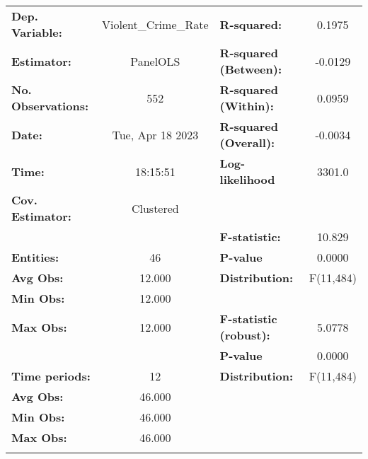 \begin{center}
\begin{tabular}{lclc}
\toprule
\textbf{Dep. Variable:}           & Violent\_Crime\_Rate & \textbf{  R-squared:         }   &      0.1975      \\
\textbf{Estimator:}               &       PanelOLS       & \textbf{  R-squared (Between):}  &     -0.0129      \\
\textbf{No. Observations:}        &         552          & \textbf{  R-squared (Within):}   &      0.0959      \\
\textbf{Date:}                    &   Tue, Apr 18 2023   & \textbf{  R-squared (Overall):}  &     -0.0034      \\
\textbf{Time:}                    &       18:15:51       & \textbf{  Log-likelihood     }   &      3301.0      \\
\textbf{Cov. Estimator:}          &      Clustered       & \textbf{                     }   &                  \\
\textbf{}                         &                      & \textbf{  F-statistic:       }   &      10.829      \\
\textbf{Entities:}                &          46          & \textbf{  P-value            }   &      0.0000      \\
\textbf{Avg Obs:}                 &        12.000        & \textbf{  Distribution:      }   &    F(11,484)     \\
\textbf{Min Obs:}                 &        12.000        & \textbf{                     }   &                  \\
\textbf{Max Obs:}                 &        12.000        & \textbf{  F-statistic (robust):} &      5.0778      \\
\textbf{}                         &                      & \textbf{  P-value            }   &      0.0000      \\
\textbf{Time periods:}            &          12          & \textbf{  Distribution:      }   &    F(11,484)     \\
\textbf{Avg Obs:}                 &        46.000        & \textbf{                     }   &                  \\
\textbf{Min Obs:}                 &        46.000        & \textbf{                     }   &                  \\
\textbf{Max Obs:}                 &        46.000        & \textbf{                     }   &                  \\
\textbf{}                         &                      & \textbf{                     }   &                  \\

\end{tabular}
\end{center}
